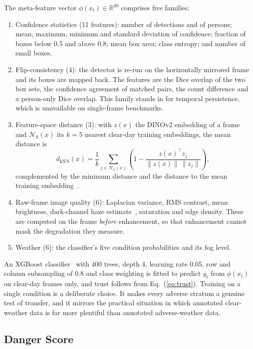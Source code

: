 \documentclass[pdflatex,sn-mathphys-num]{sn-jnl}
\begin{document}
The meta-feature vector $\phi(x_t) \in \mathbb{R}^{30}$ comprises five families:
\begin{enumerate}
\item Confidence statistics (11 features): number of detections and of persons; mean, maximum, minimum and standard deviation of confidence; fraction of boxes below 0.5 and above 0.8; mean box area; class entropy; and number of small boxes.
\item Flip-consistency (4): the detector is re-run on the horizontally mirrored frame and its boxes are mapped back. The features are the Dice overlap of the two box sets, the confidence agreement of matched pairs, the count difference and a person-only Dice overlap. This family stands in for temporal persistence, which is unavailable on single-frame benchmarks.
\item Feature-space distance (3): with $z(x)$ the DINOv2 embedding of a frame and $\mathcal{N}_k(x)$ its $k=5$ nearest clear-day training embeddings, the mean distance is
\begin{equation}
d_{\mathrm{kNN}}(x) = \frac{1}{k}\sum_{j \in \mathcal{N}_k(x)} \left(1 - \frac{z(x)^\top z_j}{\lVert z(x)\rVert\,\lVert z_j\rVert}\right),
\label{eq:knn}
\end{equation}
complemented by the minimum distance and the distance to the mean training embedding~\cite{sun2022knn}.
\item Raw-frame image quality (6): Laplacian variance, RMS contrast, mean brightness, dark-channel haze estimate~\cite{he2011darkchannel}, saturation and edge density. These are computed on the frame \emph{before} enhancement, so that enhancement cannot mask the degradation they measure.
\item Weather (6): the classifier's five condition probabilities and its fog level.
\end{enumerate}

An XGBoost classifier~\cite{chen2016xgboost} with 400 trees, depth 4, learning rate 0.05, row and column subsampling of 0.8 and class weighting is fitted to predict $y_t$ from $\phi(x_t)$ on clear-day frames only, and trust follows from Eq.~(\ref{eq:trust}). Training on a single condition is a deliberate choice. It makes every adverse stratum a genuine test of transfer, and it mirrors the practical situation in which annotated clear-weather data is far more plentiful than annotated adverse-weather data.

\subsection{Danger Score}\label{sec:danger}
\end{document}
